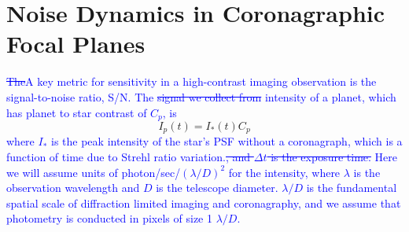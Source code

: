 \documentclass[10pt,preprint]{aastex631}
\newcommand{\jrmadd}[1]{\textcolor{blue}{#1}}
\newcommand{\jrmrmv}[1]{\textcolor{blue}{\sout{#1}}}
\newcommand{\mpfadd}[1]{\textcolor{avocado}{#1}}
\newcommand{\mpfrmv}[1]{\textcolor{avocado}{\sout{#1}}}
\begin{document}


\section{Noise Dynamics in Coronagraphic Focal Planes}
\label{sec:noise}
\jrmadd{\mpfrmv{The}\mpfadd{A} key metric for sensitivity in a high-contrast imaging observation is the signal-to-noise ratio, S/N.  The \jrmrmv{signal we collect from} intensity of a planet, which has planet to star contrast of $C_p$, is }
\begin{equation}
I_p(t) = I_{*}(t) C_p
\label{eqn:signal}
\end{equation}
\jrmadd{where $I_{*}$ is the peak intensity of the star's PSF without a coronagraph, which is a function of time due to Strehl ratio variation.\jrmrmv{, and $\Delta t$ is the exposure time.}  Here we will assume units of photon/sec/$(\lambda/D)^2$ for the intensity, where $\lambda$ is the observation wavelength and $D$ is the telescope diameter.  $\lambda/D$ is the fundamental spatial scale of diffraction limited imaging and coronagraphy, and we assume that photometry is conducted in pixels of size 1 $\lambda/D$.}
\end{document}
